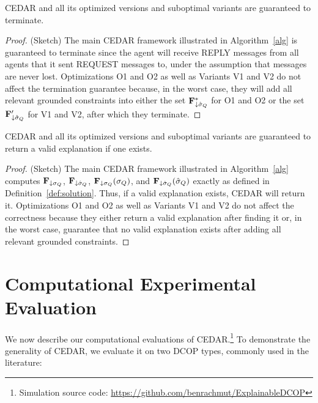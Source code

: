 \documentclass[twoside,11pt]{article}
\begin{document}
\begin{theorem}
CEDAR and all its optimized versions and suboptimal variants are guaranteed to terminate.
\label{th:completeness}
\end{theorem}
\begin{proof} (Sketch)
The main CEDAR framework illustrated in Algorithm~\ref{alg} is guaranteed to terminate since the agent will receive REPLY messages from all agents that it sent REQUEST messages to, under the assumption that messages are never lost. Optimizations O1 and O2 as well as Variants V1 and V2 do not affect the termination guarantee because, in the worst case, they will add all relevant grounded constraints into either the set ${\bf{F}}^*_{\downarrow \hat{\sigma}_Q}$ for O1 and O2 or the set ${\bf{F}}'_{\downarrow \hat{\sigma}_Q}$ for V1 and V2, after which they terminate. 
\end{proof}

\begin{theorem}
CEDAR and all its optimized versions and suboptimal variants are guaranteed to return a valid explanation if one exists.
\label{th:correctness}
\end{theorem}
\begin{proof} (Sketch)
The main CEDAR framework illustrated in Algorithm~\ref{alg} computes ${\bf{F}}_{\downarrow \sigma_Q}$, ${\bf{F}}_{\downarrow \hat{\sigma}_Q}$, ${\bf{F}}_{\downarrow \sigma_Q}(\sigma_Q)$, and ${\bf{F}}_{\downarrow \hat{\sigma}_Q}(\hat{\sigma}_Q)$ exactly as defined in Definition~\ref{def:solution}. Thus, if a valid explanation exists, CEDAR will return it. Optimizations O1 and O2 as well as Variants V1 and V2 do not affect the correctness because they either return a valid explanation after finding it or, in the worst case, guarantee that no valid explanation exists after adding all relevant grounded constraints.%
\end{proof}

\section{Computational Experimental Evaluation}

We now describe our computational evaluations of CEDAR.\footnote{Simulation source code:  \url{https://github.com/benrachmut/ExplainableDCOP}} To demonstrate the generality of CEDAR, we evaluate it on two DCOP types, commonly used in the literature:
\end{document}
